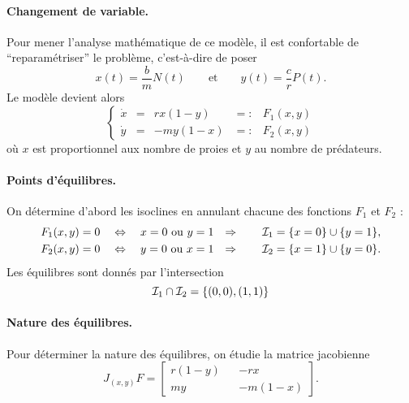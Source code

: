 \paragraph*{Changement de variable.}
Pour mener l'analyse mathématique de ce modèle, il est confortable de ``reparamétriser'' le problème, c'est-à-dire de poser
$$
x(t) = \frac{b}m N(t)
\qquad \text{et} \qquad
y(t) = \frac{c}r P(t).
$$
Le modèle devient alors
$$
\left\{\begin{array}{rcrcl} 
  \dot x & = & r x (1-y) & =: & F_1(x, y) \\
  \dot y & = & -m y (1-x) & =: & F_2(x, y)
\end{array}\right.
$$
où $x$ est proportionnel aux nombre de proies et $y$ au nombre de prédateurs.

\paragraph*{Points d'équilibres.}
On détermine d'abord les isoclines en annulant chacune des fonctions $F_1$ et $F_2$ :
\begin{align*}
  F_1(x, y) & = 0 \quad \Leftrightarrow \quad x = 0 \text{ ou } y = 1 &
  \Rightarrow \qquad \mathcal{I}_1 & = \{x = 0\} \cup \{y = 1\}, \\
  F_2(x, y) & = 0 \quad \Leftrightarrow \quad y = 0 \text{ ou } x = 1 &
  \Rightarrow \qquad \mathcal{I}_2 & = \{x = 1\} \cup \{y = 0\}.
\end{align*}
Les équilibres sont donnés par l'intersection 
$$
\mathcal{I}_1 \cap \mathcal{I}_2 = \{(0, 0), (1, 1)\}
$$

\paragraph*{Nature des équilibres.}
Pour déterminer la nature des équilibres, on étudie la matrice jacobienne
$$
J_{(x, y)}F = 
  \left[\begin{array}{ccc} 
    r (1-y) & & -r x \\
    m y & & -m (1-x)
  \end{array}\right].
$$

